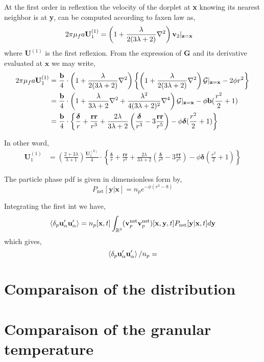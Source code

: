 At the first order in reflextion the velocity of the dorplet at \textbf{x} knowing its nearest neighbor is at \textbf{y}, can be computed according to faxen law as, 
\begin{align}
    2 \pi \mu_f a \textbf{U}_1^{(1)}
    &= \left(1 + \frac{\lambda}{2(3\lambda +2)}\mathbf{\nabla}^2\right)\textbf{v}_2|_{\textbf{z} = \textbf{x}}
\end{align}
where $\textbf{U}^{(1)}$ is the first reflexion. 
From the expression of $\mathbf{G}$ and its derivative evaluated at $\textbf{x}$ we may write, 
\begin{align}
    2 \pi \mu_f a \textbf{U}_1^{(1)}
    &= 
    \frac{\textbf{b}}{4}\cdot\left(1+ \frac{\lambda}{2(3\lambda +2)}\mathbf{\nabla}^2\right) \left\{\left(1 + \frac{\lambda}{2(3\lambda +2)}\mathbf{\nabla}^2\right)\mathcal{G}|_{\textbf{z} = \textbf{x}}  - 2 \phi r^2 \right\} \\
    &= 
    \frac{\textbf{b}}{4}\cdot\left(1+ \frac{\lambda}{3\lambda +2}\mathbf{\nabla}^2+ \frac{\lambda^2}{4(3\lambda +2)^2}\mathbf{\nabla}^4\right)\mathcal{G}|_{\textbf{z} = \textbf{x}}
    - \phi \textbf{b} (\frac{r^2}{2} +1 )\\
    &=\frac{\textbf{b}}{4}\cdot\left\{ \frac{\bm\delta}{r}+ \frac{\textbf{rr}}{r^3}+ \frac{2\lambda}{3\lambda +2} \left(
        \frac{\bm\delta}{r^3} - 3 \frac{\textbf{rr}}{r^5}
    \right)
    - \phi \bm\delta (\frac{r^2}{2} +1 )
    \right\}
\end{align}

In other word, 
\begin{align}
    \textbf{U}_1^{(1)}
    &=\left(\frac{2+3\lambda}{\lambda +1}\right)\frac{    \textbf{U}_1^{(0)}    }{4}\cdot\left\{ \frac{\bm\delta}{r}+ \frac{\textbf{rr}}{r^3}+ \frac{2\lambda}{3\lambda +2} \left(
        \frac{\bm\delta}{r^3} - 3 \frac{\textbf{rr}}{r^5}
    \right)
    - \phi \bm\delta (\frac{r^2}{2} +1 )
    \right\}
\end{align}




The particle phase pdf is given in dimensionless form by, 
\begin{equation*}
    P_\text{nst}[\textbf{y}|\textbf{x}]
    =
    n_p e^{- \phi (r^3 - 8)}
\end{equation*}

Integrating the first int we have, 
\begin{equation*}
    \left<\delta_p \textbf{u}_\alpha'\textbf{u}_\alpha'\right>
    = 
    n_p[\textbf{x},t]
    \int_{\mathbb{R}^3}
    (\textbf{v}^\text{nst}_p
    \textbf{v}^\text{nst}_p)[\textbf{x},\textbf{y},t]
    P_\text{nst}[\textbf{y}|\textbf{x},t]
    d\textbf{y}
\end{equation*}
which gives, 
\begin{equation*}
    \left<\delta_p \textbf{u}_\alpha'\textbf{u}_\alpha'\right> / n_p 
    = 
\end{equation*}


\section*{Comparaison of the distribution}
\section*{Comparaison of the granular temperature}